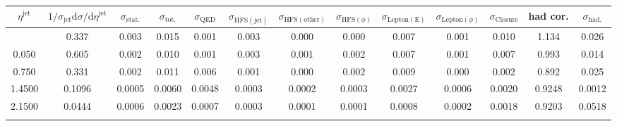 \begin{table}[h!]\n\centering\n\begin{adjustbox}{width=1\textwidth}\n\begin{tabular}{| c | c | c | c || c | c | c | c | c | c | c || c | c |}\n\hline\n$\eta^\mathrm{jet}$&$1/\sigma_\mathrm{jet}\mathrm{d}\sigma/\mathrm{d}\eta^\mathrm{jet}$& $\sigma_\mathrm{stat.}$& $\sigma_\mathrm{tot.}$&$\sigma_\mathrm{QED}$&$\sigma_\mathrm{HFS(jet)}$&$\sigma_\mathrm{HFS(other)}$ &$\sigma_{\mathrm{HFS}(\phi)}$&$\sigma_\mathrm{Lepton(E)}$&$\sigma_{\mathrm{Lepton}(\phi)}$&$\sigma_\mathrm{Closure}$ & had cor. & $\sigma_\mathrm{had.}$\\
\hline\n-0.650&0.337&0.003&0.015&0.001&0.003&0.000&0.000&0.007&0.001&0.010&1.134&0.026 \\
0.050&0.605&0.002&0.010&0.001&0.003&0.001&0.002&0.007&0.001&0.007&0.993&0.014 \\
0.750&0.331&0.002&0.011&0.006&0.001&0.000&0.002&0.009&0.000&0.002&0.892&0.025 \\
1.4500&0.1096&0.0005&0.0060&0.0048&0.0003&0.0002&0.0003&0.0027&0.0006&0.0020&0.9248&0.0012 \\
2.1500&0.0444&0.0006&0.0023&0.0007&0.0003&0.0001&0.0001&0.0008&0.0002&0.0018&0.9203&0.0518 \\
\hline\n\end{tabular}\n\end{adjustbox}\n\end{table}\n